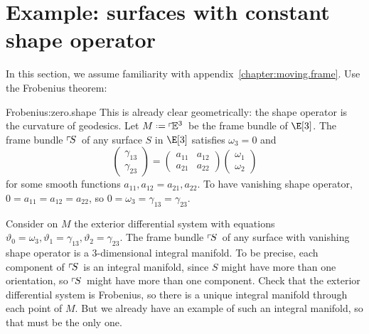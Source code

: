 \section{Example: surfaces with constant shape operator}
In this section, we assume familiarity with appendix~\ref{chapter:moving.frame}.
Use the Frobenius theorem:
\begin{answer}{Frobenius:zero.shape}
This is already clear geometrically: the shape operator is the curvature of geodesics.
Let \(M\defeq\frameBundleE{3}\) be the frame bundle of \(\E[3]\).
The frame bundle \(\left\ulcorner\!S\right.\) of any surface \(S\) in \(\E[3]\) satisfies \(\omega_3=0\) and 
\[
\begin{pmatrix}
\gamma_{13} \\
\gamma_{23} 
\end{pmatrix}
=
\begin{pmatrix}
a_{11} & a_{12} \\
a_{21} & a_{22}
\end{pmatrix}
\begin{pmatrix}
\omega_1 \\
\omega_2 
\end{pmatrix}
\]
for some smooth functions \(a_{11}, a_{12}=a_{21}, a_{22}\).
To have vanishing shape operator, \(0=a_{11}=a_{12}=a_{22}\), so
\(0=\omega_3=\gamma_{13}=\gamma_{23}\).

Consider on \(M\) the exterior differential system with equations \(\vartheta_0 = \omega_3, \vartheta_1=\gamma_{13}, \vartheta_2=\gamma_{23}\).
The frame bundle \(\left\ulcorner\!S\right.\) of any surface with vanishing shape operator is a \(3\)-dimensional integral manifold.
To be precise, each component of \(\left\ulcorner\!S\right.\) is an integral manifold, since \(S\) might have more than one orientation, so \(\left\ulcorner\!S\right.\) might have more than one component.
Check that the exterior differential system is Frobenius, so there is a unique integral manifold through each point of \(M\).
But we already have an example of such an integral manifold, so that must be the only one.
\end{answer}
